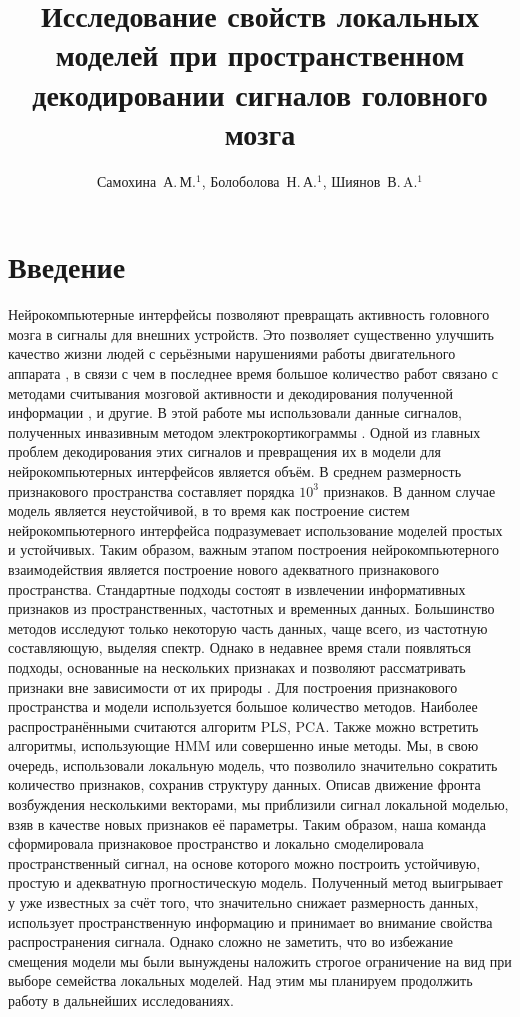 \documentclass[12pt,twoside]{article}
\title
    [Исследование свойств локальных моделей при пространственном декодировании сигналов головного мозга] 
    {Исследование свойств локальных моделей при пространственном декодировании сигналов головного мозга}
\author
    [Самохина~А.\,М.] %
    {Самохина~А.\,М.$^1$, Болоболова~Н.\,А.$^1$, Шиянов~В.\,A.$^1$} %
\begin{document}
\maketitle
\bigskip
\bigskip
\bigskip
\bigskip
\maketitleSecondary

\section{Введение}
Нейрокомпьютерные интерфейсы позволяют превращать активность головного мозга в сигналы для внешних устройств. Это позволяет существенно улучшить качество жизни людей с серьёзными нарушениями работы двигательного аппарата \cite{Donoghue2008}, в связи с чем в последнее время большое количество работ связано с методами считывания мозговой активности и декодирования полученной информации \cite{Hu2018}\cite{Song2017}\cite{Loza2017}\cite{Eliseyev2016}\cite{Gaglianese2016}\cite{Bundy2016}\cite{Morishita2014}, и другие. 
В этой работе мы использовали данные сигналов, полученных инвазивным методом электрокортикограммы \cite{Sirven2014}. Одной из главных проблем декодирования этих сигналов и превращения их в модели для нейрокомпьютерных интерфейсов является объём. В среднем размерность признакового пространства составляет порядка $10^3$ признаков. В данном случае модель является неустойчивой, в то время как построение систем нейрокомпьютерного интерфейса подразумевает использование моделей простых и устойчивых. Таким образом, важным этапом построения нейрокомпьютерного взаимодействия является построение нового адекватного признакового пространства. 
Стандартные подходы состоят в извлечении информативных признаков из пространственных, частотных и временных данных. Большинство методов исследуют только некоторую часть данных, чаще всего, из частотную составляющую, выделяя спектр. Однако в недавнее время стали появляться подходы, основанные на нескольких признаках и позволяют рассматривать признаки вне зависимости от их природы \cite{Eliseyev2016}\cite{Motrenko2018}. Для построения признакового пространства и модели используется большое количество методов.  Наиболее распространёнными считаются алгоритм PLS\cite{Rosipal2006}\cite{Eliseyev2016}, PCA\cite{Zhao2010}. Также можно встретить алгоритмы, использующие HMM\cite{Zhao2014} или совершенно иные\cite{Loza2017} методы. 
Мы, в свою очередь, использовали локальную модель, что позволило значительно сократить количество признаков, сохранив структуру данных. Описав движение фронта возбуждения несколькими векторами, мы приблизили сигнал локальной моделью, взяв в качестве новых признаков её параметры. Таким образом, наша команда сформировала признаковое пространство и локально смоделировала пространственный сигнал, на основе которого можно построить устойчивую, простую и адекватную прогностическую модель.
Полученный  метод выигрывает у уже известных за счёт того, что значительно снижает размерность данных,  использует пространственную информацию и принимает во внимание свойства распространения сигнала. Однако сложно не заметить, что во избежание смещения модели мы были вынуждены наложить строгое ограничение на вид при выборе семейства локальных моделей. Над этим мы планируем продолжить работу в дальнейших исследованиях.



\end{document}
